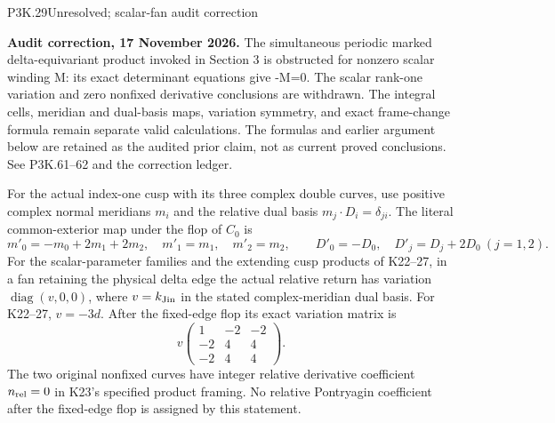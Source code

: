 \begin{statement}{P3K.29}{Unresolved; scalar-fan audit correction}
\par\noindent\textbf{Audit correction, 17 November 2026.} The simultaneous periodic marked delta-equivariant product invoked in Section 3 is obstructed for nonzero scalar winding M: its exact determinant equations give -M=0. The scalar rank-one variation and zero nonfixed derivative conclusions are withdrawn. The integral cells, meridian and dual-basis maps, variation symmetry, and exact frame-change formula remain separate valid calculations. The formulas and earlier argument below are retained as the audited prior claim, not as current proved conclusions. See P3K.61--62 and the correction ledger.
\medskip

For the actual index-one cusp with its three complex double curves,
use positive complex normal meridians \(m_i\) and the relative dual
basis \(m_j\cdot D_i=\delta_{ji}\). The literal common-exterior map
under the flop of \(C_0\) is
\[
 m'_0=-m_0+2m_1+2m_2,\quad m'_1=m_1,\quad m'_2=m_2,
 \qquad D'_0=-D_0,\quad D'_j=D_j+2D_0\ (j=1,2).
\]
For the scalar-parameter families and the extending cusp products
of K22--27, in a fan retaining the physical delta edge the actual
relative return has variation \(\operatorname{diag}(v,0,0)\), where
\(v=k_{\rm Jin}\) in the stated complex-meridian dual basis.
For K22--27, \(v=-3d\). After the fixed-edge flop its exact
variation matrix is
\[
 v\begin{pmatrix}1&-2&-2\\-2&4&4\\-2&4&4\end{pmatrix}.
\]
The two original nonfixed curves have integer relative derivative
coefficient \(n_{\rm rel}=0\) in K23's specified product framing.
No relative Pontryagin coefficient after the fixed-edge flop is
assigned by this statement.
\end{statement}
